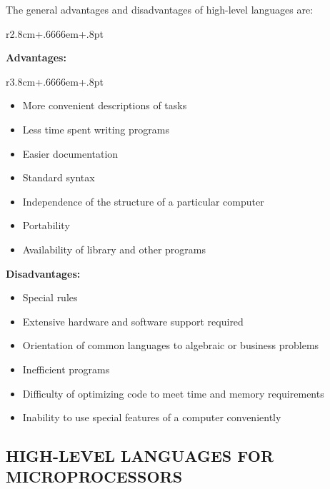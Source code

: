 \documentclass{book}
\begin{document}
The general advantages and disadvantages of high-level languages are:
\begin{wrapfigure}{r}{2.8cm+.6666em+.8pt}
\end{wrapfigure}
\textbf{Advantages:}
\begin{wrapfigure}{r}{3.8cm+.6666em+.8pt}
\end{wrapfigure}
\begin{itemize}
\item{More convenient descriptions of tasks}
\item{Less time spent writing programs}
\item{Easier documentation}
\item{Standard syntax}
\item{Independence of the structure of a particular computer}
\item{Portability}
\item{Availability of library and other programs}
\end{itemize}

\textbf{Disadvantages:}
\begin{itemize}
\item{Special rules}
\item{Extensive hardware and software support required}
\item{Orientation of common languages to algebraic or business problems}
\item{Inefficient programs}
\item{Difficulty of optimizing code to meet time and memory requirements}
\item{Inability to use special features of a computer conveniently}
\end{itemize}

\subsection*{HIGH-LEVEL LANGUAGES FOR MICROPROCESSORS}
\end{document}
